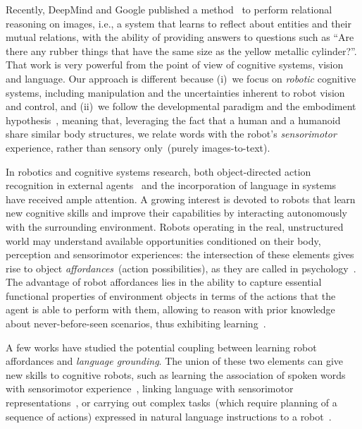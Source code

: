 Recently, DeepMind and Google published a method~\cite{santoro:2017:relational_reasoning} to perform relational reasoning on images, i.e., a system that learns to reflect about entities and their mutual relations, with the ability of providing answers to questions such as ``Are there any rubber things that have the same size as the yellow metallic cylinder?''.
That work is very powerful from the point of view of cognitive systems, vision and language.
Our approach is different because (i)~we focus on \emph{robotic} cognitive systems, including manipulation and the uncertainties inherent to robot vision and control, and (ii)~we follow the developmental paradigm and the embodiment hypothesis~\cite{lungarella:2003:devrobsurvey}, meaning that, leveraging the fact that a human and a humanoid share similar body structures, we relate words with the robot's \emph{sensorimotor} experience, rather than sensory only~(purely images-to-text).

In robotics and cognitive systems research, both object-directed action recognition in external agents~\cite{koppula:2013:ijrr} and the incorporation of language in \hr{} systems~\cite{harnad:1990,matuszek:2014:aaai} have received ample attention.
A growing interest is devoted to robots that learn new cognitive skills and improve their capabilities by interacting autonomously with the surrounding environment.
Robots operating in the real, unstructured world may understand available opportunities conditioned on their body, perception and sensorimotor experiences: the intersection of these elements gives rise to object \emph{affordances}~(action possibilities), as they are called in psychology~\cite{gibson:2014}.
The advantage of robot affordances lies in the ability to capture essential functional properties of environment objects in terms of the actions that the agent is able to perform with them, allowing to reason with prior knowledge about never-before-seen scenarios, thus exhibiting learning~\cite{montesano:2008,jamone:2016:tcds}.

A few works have studied the potential coupling between learning robot affordances and \emph{language grounding}.
The union of these two elements can give new skills to cognitive robots, such as learning the association of spoken words with sensorimotor experience~\cite{salvi:2012:smcb,morse:2016:cogsci}, linking language with sensorimotor representations~\cite{stramandinoli:2016:icdl}, or carrying out complex tasks~(which require planning of a sequence of actions) expressed in natural language instructions to a robot~\cite{antunes:2016:icra}.

